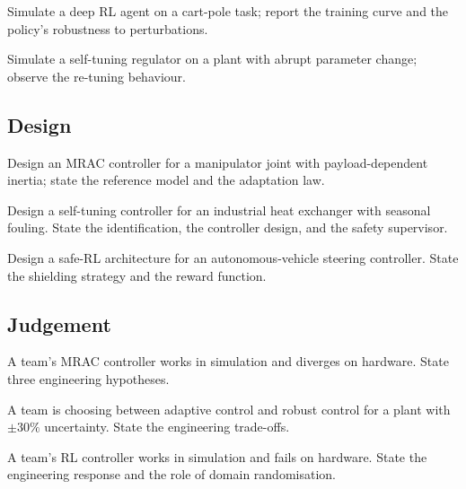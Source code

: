 \begin{exercise}
Simulate a deep RL agent on a cart-pole task; report the training curve and the policy's robustness to perturbations.
\end{exercise}

\begin{exercise}
Simulate a self-tuning regulator on a plant with abrupt parameter change; observe the re-tuning behaviour.
\end{exercise}

\subsection*{Design}

\begin{exercise}
Design an MRAC controller for a manipulator joint with payload-dependent inertia; state the reference model and the adaptation law.
\end{exercise}

\begin{exercise}
Design a self-tuning controller for an industrial heat exchanger with seasonal fouling. State the identification, the controller design, and the safety supervisor.
\end{exercise}

\begin{exercise}
Design a safe-RL architecture for an autonomous-vehicle steering controller. State the shielding strategy and the reward function.
\end{exercise}

\subsection*{Judgement}

\begin{exercise}
A team's MRAC controller works in simulation and diverges on hardware. State three engineering hypotheses.
\end{exercise}

\begin{exercise}
A team is choosing between adaptive control and robust control for a plant with $\pm 30\%$ uncertainty. State the engineering trade-offs.
\end{exercise}

\begin{exercise}
A team's RL controller works in simulation and fails on hardware. State the engineering response and the role of domain randomisation.
\end{exercise}

